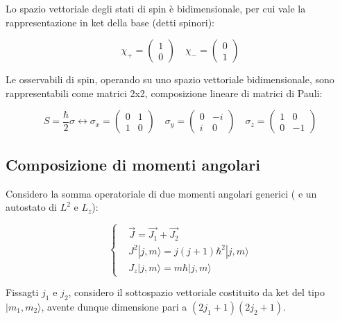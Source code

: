 \documentclass{article}
\begin{document}
Lo spazio vettoriale degli stati di spin è bidimensionale, per cui vale la rappresentazione in ket della base (detti spinori):

\begin{equation}
  \chi_+=\begin{pmatrix}
    1 \\
    0
  \end{pmatrix}
  \quad
  \chi_-=\begin{pmatrix}
    0 \\
    1
  \end{pmatrix}
\end{equation}

Le osservabili di spin, operando su uno spazio vettoriale bidimensionale, sono rappresentabili come matrici 2x2, composizione lineare di matrici di Pauli:

\begin{equation}
  S=\frac{\hbar}{2}\sigma \leftrightarrow
  \sigma_x=\begin{pmatrix}
    0 & 1 \\
    1 & 0
  \end{pmatrix}
  \quad
  \sigma_y=\begin{pmatrix}
    0 & -i \\
    i & 0
  \end{pmatrix}
  \quad
  \sigma_z=\begin{pmatrix}
    1 & 0  \\
    0 & -1
  \end{pmatrix}
\end{equation}

\subsection{Composizione di momenti angolari}

Considero la somma operatoriale di due momenti angolari generici ( e un autostato di $L^2$ e $L_z$):

\begin{equation}
  \left\{
  \begin{aligned}
     & \vec{J}=\vec{J_1}+\vec{J_2}              \\
     & J^2|j,m\rangle =j(j+1)\hbar^2|j,m\rangle \\
     & J_z|j,m\rangle =m\hbar|j,m\rangle
  \end{aligned}
  \right.
\end{equation}

Fissagti $j_1$ e $j_2$, considero il sottospazio vettoriale costituito da ket del tipo $|m_1,m_2\rangle $, avente dunque dimensione pari a $(2j_1+1)(2j_2+1)$.
\end{document}

